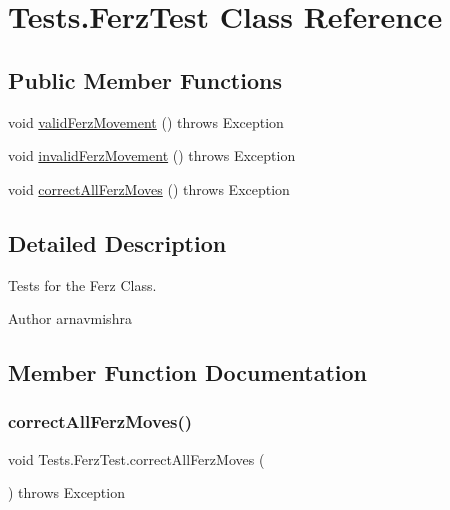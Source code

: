 \hypertarget{class_tests_1_1_ferz_test}{}\section{Tests.\+Ferz\+Test Class Reference}
\label{class_tests_1_1_ferz_test}
\subsection*{Public Member Functions}
\begin{DoxyCompactItemize}
\item 
void \hyperlink{class_tests_1_1_ferz_test_ab8577a15a8d3c03a84c2af880bf86d13}{valid\+Ferz\+Movement} ()  throws Exception 
\item 
void \hyperlink{class_tests_1_1_ferz_test_af69b9c0b5ea3735d6105c1025ad4f305}{invalid\+Ferz\+Movement} ()  throws Exception 
\item 
void \hyperlink{class_tests_1_1_ferz_test_a53d5f9199ad96f294b601cb1921b6231}{correct\+All\+Ferz\+Moves} ()  throws Exception 
\end{DoxyCompactItemize}


\subsection{Detailed Description}
Tests for the Ferz Class. \begin{DoxyAuthor}{Author}
arnavmishra 
\end{DoxyAuthor}


\subsection{Member Function Documentation}
\hypertarget{class_tests_1_1_ferz_test_a53d5f9199ad96f294b601cb1921b6231}{}\label{class_tests_1_1_ferz_test_a53d5f9199ad96f294b601cb1921b6231} 
\subsubsection{\texorpdfstring{correct\+All\+Ferz\+Moves()}{correctAllFerzMoves()}}
{\footnotesize\ttfamily void Tests.\+Ferz\+Test.\+correct\+All\+Ferz\+Moves (\begin{DoxyParamCaption}{ }\end{DoxyParamCaption}) throws Exception}

